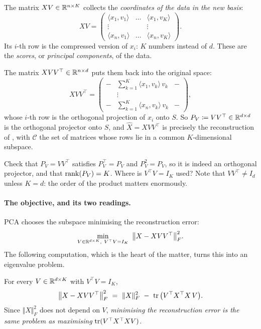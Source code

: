 The matrix $XV \in \mathbb{R}^{n \times K}$ collects the \emph{coordinates of the data in the
new basis}:
\[
XV = \begin{pmatrix}
\langle x_1, v_1 \rangle & \dots & \langle x_1, v_K \rangle \\
\vdots & & \vdots \\
\langle x_n, v_1 \rangle & \dots & \langle x_n, v_K \rangle
\end{pmatrix} .
\]
Its $i$-th row is the compressed version of $x_i$: $K$ numbers instead of $d$. These
are the \emph{scores}, or \emph{principal components}, of the data.

The matrix $X V V^\top \in \mathbb{R}^{n \times d}$ puts them back into the original space:
\[
X V V^\top = \begin{pmatrix}
- & \sum_{k=1}^K \langle x_1, v_k \rangle\, v_k & - \\
  & \vdots & \\
- & \sum_{k=1}^K \langle x_n, v_k \rangle\, v_k & -
\end{pmatrix} ,
\]
whose $i$-th row is the orthogonal projection of $x_i$ onto $S$. So $P_V \coloneqq
V V^\top \in \mathbb{R}^{d \times d}$ is the orthogonal projector onto $S$, and $\hat X = X
V V^\top$ is precisely the reconstruction of , with
$\mathcal{C}$ the set of matrices whose rows lie in a common $K$-dimensional subspace.

\begin{exercise}[$\star$]
Check that $P_V = VV^\top$ satisfies $P_V^\top = P_V$ and $P_V^2 = P_V$, so it is
indeed an orthogonal projector, and that $\operatorname{rank}(P_V) = K$. Where is $V^\top V = I_K$
used? Note that $V V^\top \neq I_d$ unless $K = d$: the order of the product matters
enormously.
\end{exercise}

\paragraph{The objective, and its two readings.}
PCA chooses the subspace minimising the reconstruction error:
\[
\min_{V \in \R^{d \times K}, \ V^\top V = I_K} \ \big\Vert X - X V V^\top \big\Vert_F^2 .
\]
The following computation, which is the heart of the matter, turns this into an
eigenvalue problem.

\begin{prop}
\label{prop:pca-two-readings}
For every $V \in \mathbb{R}^{d \times K}$ with $V^\top V = I_K$,
\[
\big\Vert X - X V V^\top \big\Vert_F^2
\ = \ \Vert X \Vert_F^2 \ - \ \operatorname{tr}\big( V^\top X^\top X\, V \big) .
\]
Since $\Vert X \Vert_F^2$ does not depend on $V$, \emph{minimising the reconstruction
error is the same problem as maximising} $\operatorname{tr}(V^\top X^\top X V)$.
\end{prop}

